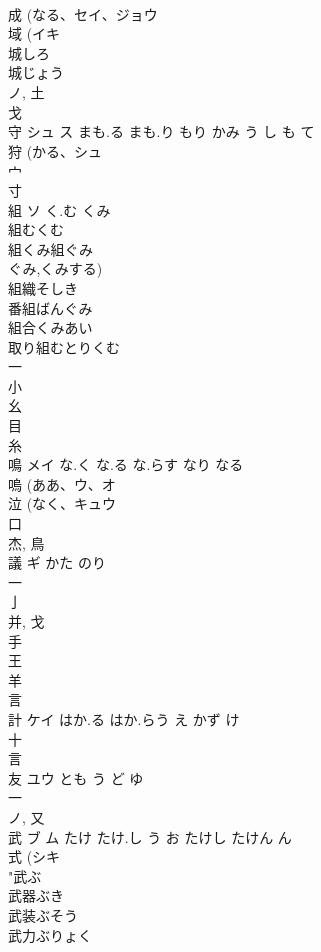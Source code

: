 \documentclass[8pt]{extreport}
\begin{document}
\begin{CJK}{UTF8}{min}
\\	成 (なる、セイ、ジョウ 
\\	域 (イキ 
\\	城しろ
\\	城じょう
\\	ノ, 土 
\\	戈 
\\	守	シュ ス	まも.る まも.り もり かみ う し も て	
\\	狩 (かる、シュ 
\\	宀 
\\	寸 
\\	組	ソ	く.む くみ	
\\	組むくむ
\\	組くみ組ぐみ
\\	ぐみ,くみする) 
\\	組織そしき
\\	番組ばんぐみ
\\	組合くみあい
\\	取り組むとりくむ
\\	一 
\\	小 
\\	幺 
\\	目 
\\	糸 
\\	鳴	メイ	な.く な.る な.らす なり なる	
\\	嗚 (ああ、ウ、オ 
\\	泣 (なく、キュウ 
\\	口 
\\	杰, 鳥 
\\	議	ギ	かた のり	
\\	一 
\\	亅 
\\	并, 戈 
\\	手 
\\	王 
\\	羊 
\\	言 
\\	計	ケイ	はか.る はか.らう え かず け	
\\	十 
\\	言 
\\	友	ユウ	とも う ど ゆ	
\\	一 
\\	ノ, 又 
\\	武	ブ ム	たけ たけ.し う お たけし たけん ん	
\\	式 (シキ 
\\	"武ぶ
\\	武器ぶき
\\	武装ぶそう
\\	武力ぶりょく

\end{CJK}
\end{document}
